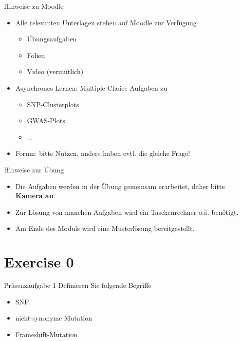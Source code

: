 \documentclass{beamer}
\begin{document}
\begin{frame}{Hinweise zu Moodle}
\begin{itemize}
    \item Alle relevanten Unterlagen stehen auf Moodle zur Verfügung
    \begin{itemize}
        \item Übungsaufgaben
        \item Folien
        \item Video (vermutlich)
    \end{itemize}
    \item Asynchrones Lernen: Multiple Choice Aufgaben zu
    \begin{itemize}
        \item SNP-Clusterplots
        \item GWAS-Plots
        \item ...
    \end{itemize}
    \item Forum: bitte Nutzen, andere haben evtl. die gleiche Frage!
\end{itemize} 
\end{frame}

\begin{frame}{Hinweise zur Übung}
\begin{itemize}
    \item Die Aufgaben werden in der Übung gemeinsam erarbeitet, daher bitte \textbf{Kamera an}. 
    \item Zur Lösung von manchen Aufgaben wird ein Taschenrechner o.ä. benötigt. 
    \item Am Ende des Moduls wird eine Musterlösung bereitgestellt. 
\end{itemize}
\end{frame}

\section{Exercise 0}

\begin{frame}{Präsenzaufgabe 1}
Definieren Sie folgende Begriffe

\begin{itemize}
    \item SNP
    \item nicht-synonyme Mutation
    \item Frameshift-Mutation
\end{itemize}
\end{frame}
\end{document}
